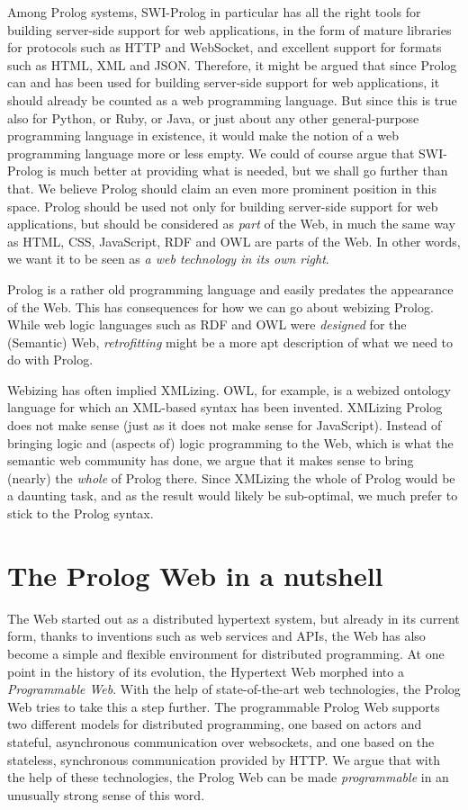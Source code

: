 \documentclass{tlp}
\begin{document}
\noindent Among Prolog systems, SWI-Prolog in particular has all the right tools for building server-side support for web applications, in the form of mature libraries for protocols such as HTTP and WebSocket, and excellent support for formats such as HTML, XML and JSON. Therefore, it might be argued that since Prolog can and has been used for building server-side support for web applications, it should already be counted as a web programming language. But since this is true also for Python, or Ruby, or Java, or just about any other general-purpose programming language in existence, it would make the notion of a web programming language more or less empty. We could of course argue that SWI-Prolog is much better at providing what is needed, but we shall go further than that. We believe Prolog should claim an even more prominent position in this space. Prolog should be used not only for building server-side support for web applications, but should be considered as \textit{part} of the Web, in much the same way as HTML, CSS, JavaScript, RDF and OWL are parts of the Web. In other words, we want it to be seen as \textit{a web technology in its own right}.

Prolog is a rather old programming language and easily predates the appearance of the Web. This has consequences for how we can go about webizing Prolog. While web logic languages such as RDF and OWL were \textit{designed} for the (Semantic) Web, \textit{retrofitting} might be a more apt description of what we need to do with Prolog.

Webizing has often implied XMLizing. OWL, for example, is a webized ontology language for which an XML-based syntax has been invented. XMLizing Prolog does not make sense (just as it does not make sense for JavaScript). Instead of bringing logic and (aspects of) logic programming to the Web, which is what the semantic web community has done, we argue that it makes sense to bring (nearly) the \textit{whole} of Prolog there. Since XMLizing the whole of Prolog would be a daunting task, and as the result would likely be sub-optimal, we much prefer to stick to the Prolog syntax.


\section{The Prolog Web in a nutshell}\label{sec:prolog-web-in-a-nutshell}

\noindent The Web started out as a distributed hypertext system, but already in its current form, thanks to inventions such as web services and APIs, the Web has also become a simple and flexible environment for distributed programming. At one point in the history of its evolution, the Hypertext Web morphed into a \textit{Programmable Web}. With the help of state-of-the-art web technologies, the Prolog Web tries to take this a step further. The programmable Prolog Web supports two different models for distributed programming, one based on actors and stateful, asynchronous communication over websockets, and one based on the stateless, synchronous communication provided by HTTP. We argue that with the help of these technologies, the Prolog Web can be made \textit{programmable} in an unusually strong sense of this word.
\end{document}
